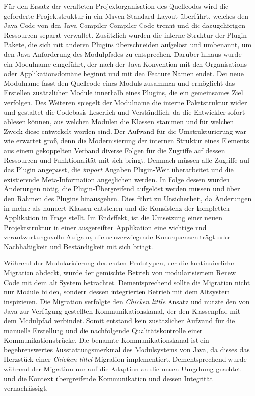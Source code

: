 Für den Ersatz der veralteten Projektorganisation des Quellcodes wird die geforderte Projektstruktur in ein Maven Standard Layout überführt, welches den Java Code von den Java Compiler-Compiler Code trennt und die dazugehörigen Ressourcen separat verwaltet. Zusätzlich wurden die interne Struktur der Plugin Pakete, die sich mit anderen Plugins überschneiden aufgelöst und umbenannt, um den Java Anforderung des Modulpfades zu entsprechen. Darüber hinaus wurde ein Modulname eingeführt, der nach der Java Konvention mit den Organisations- oder Applikationsdomäne beginnt und mit den Feature Namen endet. Der neue Modulname fasst den Quellcode eines Moduls zusammen und ermöglicht das Erstellen zusätzlicher Module innerhalb eines Plugins, die ein gemeinsames Ziel verfolgen. Des Weiteren spiegelt der Modulname die interne Paketstruktur wider und gestaltet die Codebasis Leserlich und Verständlich, da die Entwickler sofort ablesen können, aus welchen Modulen die Klassen stammen und für welchen Zweck diese entwickelt worden sind.\newline
Der Aufwand für die Umstrukturierung war wie erwartet groß, denn die Modernisierung der internen Struktur eines Elements aus einem gekoppelten Verband diverse Folgen für die Zugriffe auf dessen Ressourcen und Funktionalität mit sich bringt. Demnach müssen alle Zugriffe auf das Plugin angepasst, die \textit{import} Angaben Plugin-Weit überarbeitet und die existierende Meta-Information angeglichen werden. In Folge dessen wurden Änderungen nötig, die Plugin-Übergreifend aufgelöst werden müssen und über den Rahmen des Plugins hinausgehen. Dies führt zu Unsicherheit, da Änderungen in mehre als hundert Klassen entstehen und die Konsistenz der kompletten Applikation in Frage stellt. \newline
Im Endeffekt, ist die Umsetzung einer neuen Projektstruktur in einer ausgereiften Applikation eine wichtige und verantwortungsvolle Aufgabe, die schwerwiegende Konsequenzen trägt oder Nachhaltigkeit und Beständigkeit mit sich bringt.\bigbreak    

Während der Modularisierung des ersten Prototypen, der die kontinuierliche Migration abdeckt, wurde der gemischte Betrieb von modularisiertem Renew Code mit dem alt System betrachtet. Dementsprechend sollte die Migration nicht nur Module bilden, sondern dessen integrierten Betrieb mit dem Altsystem inspizieren.\newline 
Die Migration verfolgte den \textit{Chicken little} Ansatz und nutzte den von Java zur Verfügung gestellten Kommunikationskanal, der den Klassenpfad mit dem Modulpfad verbindet. Somit entstand kein zusätzlicher Aufwand für die manuelle Erstellung und die nachfolgende Qualitätskontrolle einer Kommunikationsbrücke. Die benannte Kommunikationskanal ist ein begehrenswertes Ausstattungsmerkmal des Modulsystems von Java, da dieses das Herzstück einer \textit{Chicken littel} Migration implementiert. Dementsprechend wurde während der Migration nur auf die Adaption an die neuen Umgebung geachtet und die Kontext übergreifende Kommunikation und dessen Integrität vernachlässigt. \newline

